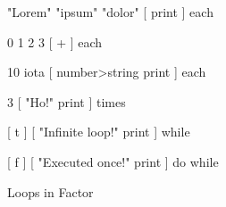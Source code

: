 \centering

  \begin{factorcode}
    { "Lorem" "ipsum" "dolor" } [ print ] each

    0 { 1 2 3 } [ + ] each

    10 iota [ number>string print ] each

    3 [ "Ho!" print ] times

    [ t ] [ "Infinite loop!" print ] while

    [ f ] [ "Executed once!" print ] do while
  \end{factorcode}

\caption{Loops in Factor}
